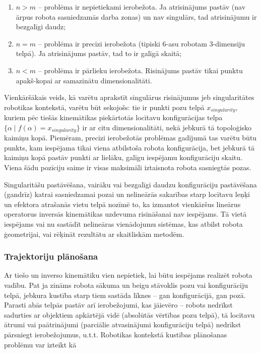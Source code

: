 \documentclass[12pt, a4paper]{article}
\numberwithin{equation}{section} %
\begin{document}
\begin{enumerate}
    \item $n > m$ -- problēma ir nepietiekami ierobežota. Ja atrisinājums pastāv (nav ārpus robota sasniedzamās darba zonas) un nav singulārs, tad atrisinājumu ir bezgalīgi daudz;
    \item $n = m$ -- problēma ir precīzi ierobežota  (tipiski 6-asu robotam 3-dimensiju telpā). Ja atrisinājums pastāv, tad to ir galīgā skaitā;
    \item $n < m$ -- problēma ir pārlieku ierobežota. Risinājums pastāv tikai punktu apakš-kopai ar samazinātu dimensionalitāti.
\end{enumerate}

Vienkāršākais veids, kā varētu aprakstīt singulārus risinājumus jeb singularitātes robotikas kontekstā, varētu būt sekojošs: tie ir punkti pozu telpā $x_{singularity}$, kuriem pēc tiešās kinemātikas piekārtotās locītavu konfigurācijas telpa $\lbrace \alpha \mid f(\alpha) = x_{singularity} \rbrace$ ir ar citu dimensionalitāti, nekā jebkurā tā topoloģisko kaimiņu kopā. Piemēram, precīzi ierobežotās problēmas gadījumā tas varētu būtu punkts, kam iespējama tikai viena atbilstoša robota konfigurācija, bet jebkurā tā kaimiņu kopā pastāv punkti ar lielāku, galīgu iespējamu konfigurāciju skaitu. Viena šādu pozīciju saime ir visas maksimāli iztaisnota robota sasniegtās pozas.

Singularitāšu pastāvēšana, vairāku vai bezgalīgi daudzu konfigurāciju pastāvēšana (gandrīz) katrai sasniedzamai pozai un nelineārās sakarības starp locītavu leņķi un efektora atrašanās vietu telpā nozīmē to, ka izmantot vienkāršus lineārus operatorus inversās kinemātikas uzdevuma risināšanai nav iespējams. Tā vietā iespējams vai nu sastādīt nelineāras vienādojumu sistēmas, kas atbilst robota ģeometrijai, vai rēķināt rezultātu ar skaitliskām metodēm. 

\subsubsection{Trajektoriju plānošana}

Ar tiešo un inverso kinemātiku vien nepietiek, lai būtu iespējams realizēt robota vadību. Pat ja zināms robota sākuma un beigu stāvoklis pozu vai konfigurāciju telpā, jebkura kustība starp tiem sastāda līknes -- gan konfigurācijā, gan pozā. Parasti abās telpās pastāv arī ierobežojumi, kas jāievēro -- robots nedrīkst sadurties ar objektiem apkārtējā vidē (absolūtās vērtības pozu telpā), tā locītavu ātrumi vai paātrinājumi (parciālie atvasinājumi konfigurāciju telpā) nedrīkst pārsniegt ierobežojumus, u.t.t. Robotikas kontekstā kustības plānošanas problēmu var izteikt kā \cite{motion_planning_illinois}
\end{document}
